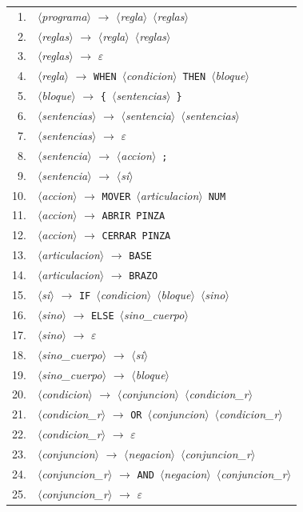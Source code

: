 \documentclass[10pt,a4paper]{article}
\newcommand{\nt}[1]{\ensuremath{\langle}\textit{#1}\ensuremath{\rangle}}   %
\newcommand{\tm}[1]{\texttt{#1}}                                          %
\begin{document}
\begin{center}\small
\begin{tabular}{@{}rl@{}}
1. & \nt{programa} $\rightarrow$ \nt{regla}\ \nt{reglas} \\
2. & \nt{reglas} $\rightarrow$ \nt{regla}\ \nt{reglas} \\
3. & \nt{reglas} $\rightarrow$ $\varepsilon$ \\
4. & \nt{regla} $\rightarrow$ \tm{WHEN}\ \nt{condicion}\ \tm{THEN}\ \nt{bloque} \\
5. & \nt{bloque} $\rightarrow$ \tm{\{}\ \nt{sentencias}\ \tm{\}} \\
6. & \nt{sentencias} $\rightarrow$ \nt{sentencia}\ \nt{sentencias} \\
7. & \nt{sentencias} $\rightarrow$ $\varepsilon$ \\
8. & \nt{sentencia} $\rightarrow$ \nt{accion}\ \tm{;} \\
9. & \nt{sentencia} $\rightarrow$ \nt{si} \\
10. & \nt{accion} $\rightarrow$ \tm{MOVER}\ \nt{articulacion}\ \tm{NUM} \\
11. & \nt{accion} $\rightarrow$ \tm{ABRIR}\ \tm{PINZA} \\
12. & \nt{accion} $\rightarrow$ \tm{CERRAR}\ \tm{PINZA} \\
13. & \nt{articulacion} $\rightarrow$ \tm{BASE} \\
14. & \nt{articulacion} $\rightarrow$ \tm{BRAZO} \\
15. & \nt{si} $\rightarrow$ \tm{IF}\ \nt{condicion}\ \nt{bloque}\ \nt{sino} \\
16. & \nt{sino} $\rightarrow$ \tm{ELSE}\ \nt{sino\_cuerpo} \\
17. & \nt{sino} $\rightarrow$ $\varepsilon$ \\
18. & \nt{sino\_cuerpo} $\rightarrow$ \nt{si} \\
19. & \nt{sino\_cuerpo} $\rightarrow$ \nt{bloque} \\
20. & \nt{condicion} $\rightarrow$ \nt{conjuncion}\ \nt{condicion\_r} \\
21. & \nt{condicion\_r} $\rightarrow$ \tm{OR}\ \nt{conjuncion}\ \nt{condicion\_r} \\
22. & \nt{condicion\_r} $\rightarrow$ $\varepsilon$ \\
23. & \nt{conjuncion} $\rightarrow$ \nt{negacion}\ \nt{conjuncion\_r} \\
24. & \nt{conjuncion\_r} $\rightarrow$ \tm{AND}\ \nt{negacion}\ \nt{conjuncion\_r} \\
25. & \nt{conjuncion\_r} $\rightarrow$ $\varepsilon$ \\

\end{tabular}
\end{center}
\end{document}
